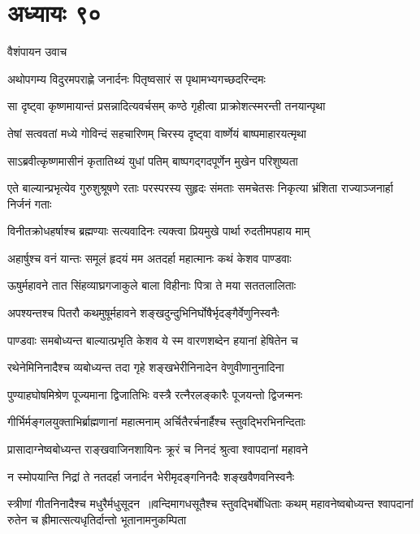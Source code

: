 \chapter{अध्यायः ९०}
\twolineshloka
{वैशंपायन उवाच}
{}


\twolineshloka
{अथोपगम्य विदुरमपराह्णे जनार्दनः}
{पितृष्वसारं स पृथामभ्यगच्छदरिन्दमः}


\twolineshloka
{सा दृष्ट्वा कृष्णमायान्तं प्रसन्नादित्यवर्चसम्}
{कण्ठे गृहीत्वा प्राक्रोशत्स्मरन्ती तनयान्पृथा}


\twolineshloka
{तेषां सत्ववतां मध्ये गोविन्दं सहचारिणम्}
{चिरस्य दृष्ट्वा वार्ष्णेयं बाष्पमाहारयत्मृथा}


\twolineshloka
{साऽब्रवीत्कृष्णमासीनं कृतातिथ्यं युधां पतिम्}
{बाष्पगद्गदपूर्णेन मुखेन परिशुष्यता}


\threelineshloka
{एते बाल्यान्प्रभृत्येव गुरुशुश्रूषणे रताः}
{परस्परस्य सुहृदः संमताः समचेतसः}
{निकृत्या भ्रंशिता राज्याञ्जनार्हा निर्जनं गताः}


\twolineshloka
{विनीतक्रोधहर्षाश्च ब्रह्मण्याः सत्यवादिनः}
{त्यक्त्वा प्रियमुखे पार्था रुदतीमपहाय माम्}


\twolineshloka
{अहार्षुश्च वनं यान्तः समूलं हृदयं मम}
{अतदर्हा महात्मानः कथं केशव पाण्डवाः}


\twolineshloka
{ऊषुर्महावने तात सिंहव्याघ्रगजाकुले}
{बाला विहीनाः पित्रा ते मया सततलालिताः}


\twolineshloka
{अपश्यन्तश्च पितरौ कथमुषूर्महावने}
{शङ्खदुन्दुभिनिर्घोषैर्भृदङ्गैर्वेणुनिस्वनैः}


\twolineshloka
{पाण्डवाः समबोध्यन्त बाल्यात्प्रभृति केशव}
{ये स्म वारणशब्देन हयानां हेषितेन च}


\twolineshloka
{रथेनेमिनिनादैश्च व्यबोध्यन्त तदा गृहे}
{शङ्खभेरीनिनादेन वेणुवीणानुनादिना}


\twolineshloka
{पुण्याहघोषमिश्रेण पूज्यमाना द्विजातिभिः}
{वस्त्रै रत्नैरलङ्कारैः पूजयन्तो द्विजन्मनः}


\twolineshloka
{गीर्भिर्मङ्गलयुक्ताभिर्ब्राह्मणानां महात्मनाम्}
{अर्चितैरर्चनार्हैश्च स्तुवद्भिरभिनन्दिताः}


\twolineshloka
{प्रासादाग्नेष्वबोध्यन्त राङ्खवाजिनशायिनः}
{क्रूरं च निनदं श्रुत्वा श्वापदानां महावने}


\twolineshloka
{न स्मोपयान्ति निद्रां ते नतदर्हा जनार्दन}
{भेरीमृदङ्गनिनदैः शङ्खवैणवनिस्वनैः}


स्त्रीणां गीतनिनादैश्च मधुरैर्मधुसूदन ॥वन्दिमागधसूतैश्च स्तुवद्भिर्बोधिताः कथम्
\twolineshloka
{महावनेष्वबोध्यन्त श्वापदानां रुतेन च}
{ह्रीमात्सत्यधृतिर्दान्तो भूतानामनुकम्पिता}


